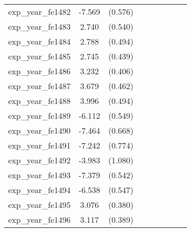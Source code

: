 {\begin{tabular}{l*{4}{cc}}
exp\_year\_fe1482&   -7.569\sym{***}&  (0.576)&                  &         &                  &         &                  &         \\
exp\_year\_fe1483&    2.740\sym{***}&  (0.540)&                  &         &                  &         &                  &         \\
exp\_year\_fe1484&    2.788\sym{***}&  (0.494)&                  &         &                  &         &                  &         \\
exp\_year\_fe1485&    2.745\sym{***}&  (0.439)&                  &         &                  &         &                  &         \\
exp\_year\_fe1486&    3.232\sym{***}&  (0.406)&                  &         &                  &         &                  &         \\
exp\_year\_fe1487&    3.679\sym{***}&  (0.462)&                  &         &                  &         &                  &         \\
exp\_year\_fe1488&    3.996\sym{***}&  (0.494)&                  &         &                  &         &                  &         \\
exp\_year\_fe1489&   -6.112\sym{***}&  (0.549)&                  &         &                  &         &                  &         \\
exp\_year\_fe1490&   -7.464\sym{***}&  (0.668)&                  &         &                  &         &                  &         \\
exp\_year\_fe1491&   -7.242\sym{***}&  (0.774)&                  &         &                  &         &                  &         \\
exp\_year\_fe1492&   -3.983\sym{***}&  (1.080)&                  &         &                  &         &                  &         \\
exp\_year\_fe1493&   -7.379\sym{***}&  (0.542)&                  &         &                  &         &                  &         \\
exp\_year\_fe1494&   -6.538\sym{***}&  (0.547)&                  &         &                  &         &                  &         \\
exp\_year\_fe1495&    3.076\sym{***}&  (0.380)&                  &         &                  &         &                  &         \\
exp\_year\_fe1496&    3.117\sym{***}&  (0.389)&                  &         &                  &         &                  &         \\

\end{tabular}}
